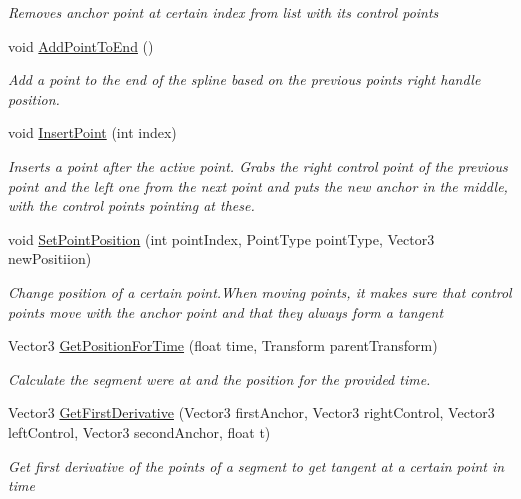 \begin{DoxyCompactItemize}
\begin{DoxyCompactList}\small\item\em Removes anchor point at certain index from list with its control points \end{DoxyCompactList}\item 
void \mbox{\hyperlink{class_spline_ad6d6a6bf25678d717d1f01fcf44fd237}{Add\+Point\+To\+End}} ()
\begin{DoxyCompactList}\small\item\em Add a point to the end of the spline based on the previous point\textquotesingle{}s right handle position. \end{DoxyCompactList}\item 
void \mbox{\hyperlink{class_spline_a3462f1dda107d0ec20ecdff11df7ab88}{Insert\+Point}} (int index)
\begin{DoxyCompactList}\small\item\em Inserts a point after the active point. Grabs the right control point of the previous point and the left one from the next point and puts the new anchor in the middle, with the control points pointing at these. \end{DoxyCompactList}\item 
void \mbox{\hyperlink{class_spline_a33f6df881b5b8980f16bf00fc85034f3}{Set\+Point\+Position}} (int point\+Index, Point\+Type point\+Type, Vector3 new\+Positiion)
\begin{DoxyCompactList}\small\item\em Change position of a certain point.\+When moving points, it makes sure that control points move with the anchor point and that they always form a tangent \end{DoxyCompactList}\item 
Vector3 \mbox{\hyperlink{class_spline_a2fe054cea6de6ba365d29a15ff37696e}{Get\+Position\+For\+Time}} (float time, Transform parent\+Transform)
\begin{DoxyCompactList}\small\item\em Calculate the segment we\textquotesingle{}re at and the position for the provided time. \end{DoxyCompactList}\item 
Vector3 \mbox{\hyperlink{class_spline_ad64325ef2a69decba37df63869d994e9}{Get\+First\+Derivative}} (Vector3 first\+Anchor, Vector3 right\+Control, Vector3 left\+Control, Vector3 second\+Anchor, float t)
\begin{DoxyCompactList}\small\item\em Get first derivative of the points of a segment to get tangent at a certain point in time \end{DoxyCompactList}\item 

\end{DoxyCompactItemize}
